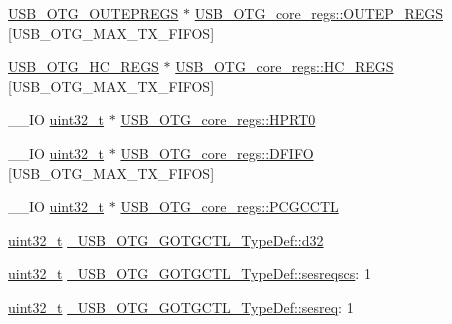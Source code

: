 \begin{DoxyCompactItemize}
\item 
\hyperlink{group_______o_u_t___endpoint-_specific___registers_ga5247fff61d820ab0db3e6d8df0441a03}{U\-S\-B\-\_\-\-O\-T\-G\-\_\-\-O\-U\-T\-E\-P\-R\-E\-G\-S} $\ast$ \hyperlink{group___u_s_b___o_t_g___d_r_i_v_e_r_ga260fda7483480de26837c4ed6740e136}{U\-S\-B\-\_\-\-O\-T\-G\-\_\-core\-\_\-regs\-::\-O\-U\-T\-E\-P\-\_\-\-R\-E\-G\-S} \mbox{[}U\-S\-B\-\_\-\-O\-T\-G\-\_\-\-M\-A\-X\-\_\-\-T\-X\-\_\-\-F\-I\-F\-O\-S\mbox{]}
\item 
\hyperlink{group_______host___channel___specific___registers_ga1b123aa3d1b9476eab8957c17af482b0}{U\-S\-B\-\_\-\-O\-T\-G\-\_\-\-H\-C\-\_\-\-R\-E\-G\-S} $\ast$ \hyperlink{group___u_s_b___o_t_g___d_r_i_v_e_r_ga567f296640c8bb116e430b37e6f0e279}{U\-S\-B\-\_\-\-O\-T\-G\-\_\-core\-\_\-regs\-::\-H\-C\-\_\-\-R\-E\-G\-S} \mbox{[}U\-S\-B\-\_\-\-O\-T\-G\-\_\-\-M\-A\-X\-\_\-\-T\-X\-\_\-\-F\-I\-F\-O\-S\mbox{]}
\item 
\-\_\-\-\_\-\-I\-O \hyperlink{stdint_8h_a435d1572bf3f880d55459d9805097f62}{uint32\-\_\-t} $\ast$ \hyperlink{group___u_s_b___o_t_g___d_r_i_v_e_r_gad1f621c1434b61b89b306a5f3f9e1125}{U\-S\-B\-\_\-\-O\-T\-G\-\_\-core\-\_\-regs\-::\-H\-P\-R\-T0}
\item 
\-\_\-\-\_\-\-I\-O \hyperlink{stdint_8h_a435d1572bf3f880d55459d9805097f62}{uint32\-\_\-t} $\ast$ \hyperlink{group___u_s_b___o_t_g___d_r_i_v_e_r_ga0c14897a61771cef53ec091dfbb93694}{U\-S\-B\-\_\-\-O\-T\-G\-\_\-core\-\_\-regs\-::\-D\-F\-I\-F\-O} \mbox{[}U\-S\-B\-\_\-\-O\-T\-G\-\_\-\-M\-A\-X\-\_\-\-T\-X\-\_\-\-F\-I\-F\-O\-S\mbox{]}
\item 
\-\_\-\-\_\-\-I\-O \hyperlink{stdint_8h_a435d1572bf3f880d55459d9805097f62}{uint32\-\_\-t} $\ast$ \hyperlink{group___u_s_b___o_t_g___d_r_i_v_e_r_gae5fe2df4421b19989a06769f2fa772e0}{U\-S\-B\-\_\-\-O\-T\-G\-\_\-core\-\_\-regs\-::\-P\-C\-G\-C\-C\-T\-L}
\item 
\hyperlink{stdint_8h_a435d1572bf3f880d55459d9805097f62}{uint32\-\_\-t} \hyperlink{group___u_s_b___o_t_g___d_r_i_v_e_r_gaf6bba95362f08d9514ab8096cb8cf6a7}{\-\_\-\-U\-S\-B\-\_\-\-O\-T\-G\-\_\-\-G\-O\-T\-G\-C\-T\-L\-\_\-\-Type\-Def\-::d32}
\item 
\hyperlink{stdint_8h_a435d1572bf3f880d55459d9805097f62}{uint32\-\_\-t} \hyperlink{group___u_s_b___o_t_g___d_r_i_v_e_r_gab0d6bf182833ffbcb57a537824c74db0}{\-\_\-\-U\-S\-B\-\_\-\-O\-T\-G\-\_\-\-G\-O\-T\-G\-C\-T\-L\-\_\-\-Type\-Def\-::sesreqscs}\-: 1
\item 
\hyperlink{stdint_8h_a435d1572bf3f880d55459d9805097f62}{uint32\-\_\-t} \hyperlink{group___u_s_b___o_t_g___d_r_i_v_e_r_gaae14bcb1524970983dc360d7e3d79fea}{\-\_\-\-U\-S\-B\-\_\-\-O\-T\-G\-\_\-\-G\-O\-T\-G\-C\-T\-L\-\_\-\-Type\-Def\-::sesreq}\-: 1

\end{DoxyCompactItemize}
